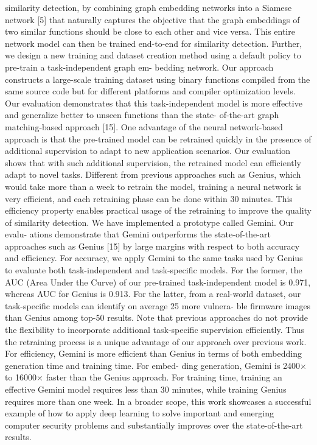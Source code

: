 similarity detection, by combining graph embedding networks into
a Siamese network [5] that naturally captures the objective that
the graph embeddings of two similar functions should be close to
each other and vice versa. This entire network model can then be
trained end-to-end for similarity detection.
Further, we design a new training and dataset creation method
using a default policy to pre-train a task-independent graph em-
bedding network. Our approach constructs a large-scale training
dataset using binary functions compiled from the same source code
but for different platforms and compiler optimization levels. Our
evaluation demonstrates that this task-independent model is more
effective and generalize better to unseen functions than the state-
of-the-art graph matching-based approach [15].
One advantage of the neural network-based approach is that
the pre-trained model can be retrained quickly in the presence
of additional supervision to adapt to new application scenarios.
Our evaluation shows that with such additional supervision, the
retrained model can efficiently adapt to novel tasks. Different from
previous approaches such as Genius, which would take more than
a week to retrain the model, training a neural network is very
efficient, and each retraining phase can be done within 30 minutes.
This efficiency property enables practical usage of the retraining to
improve the quality of similarity detection.
We have implemented a prototype called Gemini. Our evalu-
ations demonstrate that Gemini outperforms the state-of-the-art
approaches such as Genius [15] by large margins with respect to
both accuracy and efficiency. For accuracy, we apply Gemini to
the same tasks used by Genius to evaluate both task-independent
and task-specific models. For the former, the AUC (Area Under the
Curve) of our pre-trained task-independent model is 0.971, whereas
AUC for Genius is 0.913. For the latter, from a real-world dataset,
our task-specific models can identify on average 25 more vulnera-
ble firmware images than Genius among top-50 results. Note that
previous approaches do not provide the flexibility to incorporate
additional task-specific supervision efficiently. Thus the retraining
process is a unique advantage of our approach over previous work.
For efficiency, Gemini is more efficient than Genius in terms
of both embedding generation time and training time. For embed-
ding generation, Gemini is 2400× to 16000× faster than the Genius
approach. For training time, training an effective Gemini model
requires less than 30 minutes, while training Genius requires more
than one week.
In a broader scope, this work showcases a successful example
of how to apply deep learning to solve important and emerging
computer security problems and substantially improves over the
state-of-the-art results.

